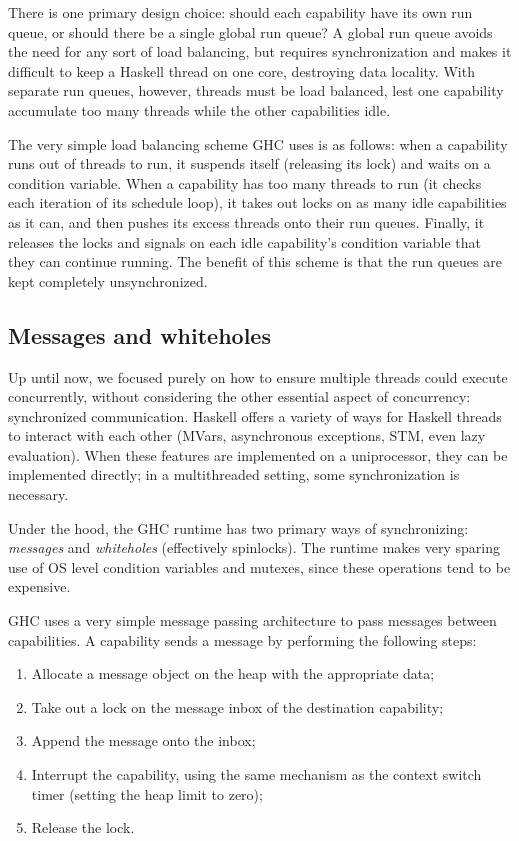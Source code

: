 There is one primary design choice: should each capability have its own
run queue, or should there be a single global run queue?  A global run
queue avoids the need for any sort of load balancing, but requires
synchronization and makes it difficult to keep a Haskell thread on one
core, destroying data locality.  With separate run queues, however,
threads must be load balanced, lest one capability accumulate too many
threads while the other capabilities idle.

The very simple load balancing scheme GHC uses is as follows: when a capability
runs out of threads to run, it suspends itself (releasing its lock) and
waits on a condition variable.  When a capability has too many threads
to run (it checks each iteration of its schedule loop), it takes out
locks on as many idle capabilities as it can, and then pushes its excess
threads onto their run queues.  Finally, it releases the locks and
signals on each idle capability's condition variable that they can
continue running.  The benefit of this scheme is that the run queues are
kept completely unsynchronized. 

\subsection{Messages and whiteholes}

Up until now, we focused purely on how to ensure multiple threads could
execute concurrently, without considering the other essential aspect of
concurrency: synchronized communication.  Haskell offers a variety of
ways for Haskell threads to interact with each other (MVars,
asynchronous exceptions, STM, even lazy evaluation).  When these features
are implemented on a uniprocessor, they can be implemented directly;
in a multithreaded setting, some synchronization is necessary.

Under the hood, the GHC runtime has two primary ways of synchronizing:
\emph{messages} and \emph{whiteholes} (effectively spinlocks).  The
runtime makes very sparing use of OS level condition variables and
mutexes, since these operations tend to be expensive.

GHC uses a very simple message passing architecture to pass messages
between capabilities.  A capability sends a message by performing the following steps:

\begin{enumerate}
    \item Allocate a message object on the heap with the appropriate data;
    \item Take out a lock on the message inbox of the destination capability;
    \item Append the message onto the inbox;
    \item Interrupt the capability, using the same mechanism as the context switch timer (setting the heap limit to zero);
    \item Release the lock.
\end{enumerate}

